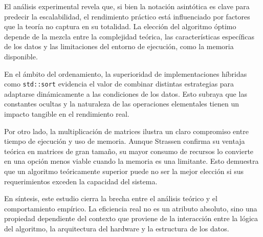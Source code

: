 El análisis experimental revela que, si bien la notación asintótica es clave para predecir la escalabilidad, el rendimiento práctico está influenciado por factores que la teoría no captura en su totalidad. La elección del algoritmo óptimo depende de la mezcla entre la complejidad teórica, las características específicas de los datos y las limitaciones del entorno de ejecución, como la memoria disponible.

En el ámbito del ordenamiento, la superioridad de implementaciones híbridas como \texttt{std::sort} evidencia el valor de combinar distintas estrategias para adaptarse dinámicamente a las condiciones de los datos. Esto subraya que las constantes ocultas y la naturaleza de las operaciones elementales tienen un impacto tangible en el rendimiento real.

Por otro lado, la multiplicación de matrices ilustra un claro compromiso entre tiempo de ejecución y uso de memoria. Aunque Strassen confirma su ventaja teórica en matrices de gran tamaño, su mayor consumo de recursos lo convierte en una opción menos viable cuando la memoria es una limitante. Esto demuestra que un algoritmo teóricamente superior puede no ser la mejor elección si sus requerimientos exceden la capacidad del sistema.

En síntesis, este estudio cierra la brecha entre el análisis teórico y el comportamiento empírico. La eficiencia real no es un atributo absoluto, sino una propiedad dependiente del contexto que proviene de la interacción entre la lógica del algoritmo, la arquitectura del hardware y la estructura de los datos.